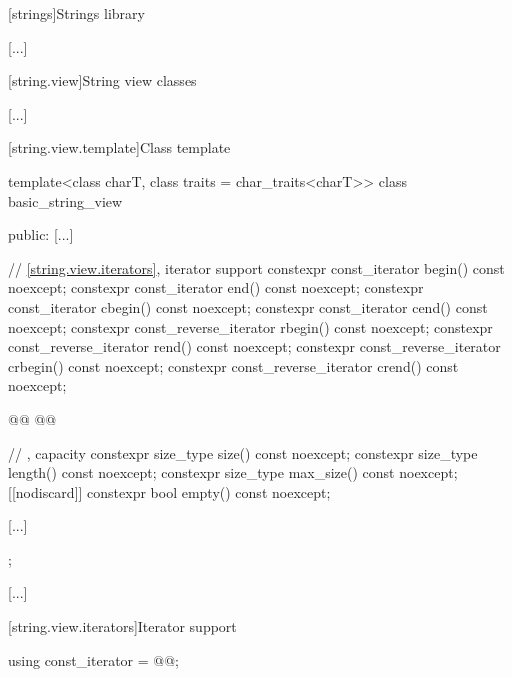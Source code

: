 
[strings]{Strings library}

[...]

\setcounter{section}{3}
[string.view]{String view classes}

[...]

\setcounter{subsection}{1}
[string.view.template]{Class template }

%
%
%
%
%
%
%
%
%
%
%
%
%
\begin{codeblock}
template<class charT, class traits = char_traits<charT>>
class basic_string_view {
public:
  [...]

  // \ref{string.view.iterators}, iterator support
  constexpr const_iterator begin() const noexcept;
  constexpr const_iterator end() const noexcept;
  constexpr const_iterator cbegin() const noexcept;
  constexpr const_iterator cend() const noexcept;
  constexpr const_reverse_iterator rbegin() const noexcept;
  constexpr const_reverse_iterator rend() const noexcept;
  constexpr const_reverse_iterator crbegin() const noexcept;
  constexpr const_reverse_iterator crend() const noexcept;

  @@
  @@

  // , capacity
  constexpr size_type size() const noexcept;
  constexpr size_type length() const noexcept;
  constexpr size_type max_size() const noexcept;
  [[nodiscard]] constexpr bool empty() const noexcept;

  [...]
};
\end{codeblock}

[...]

\setcounter{subsubsection}{1}
[string.view.iterators]{Iterator support}
\begin{itemdecl}
using const_iterator = @@;
\end{itemdecl}

